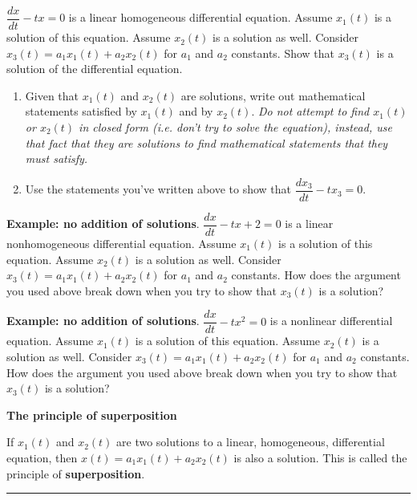 \documentclass[12pt,letterpaper,noanswers]{exam}
\begin{document}
$\dfrac{dx}{dt} - t x = 0$ is a linear homogeneous differential equation.  Assume $x_1(t)$ is a solution of this equation.  Assume $x_2(t)$ is a solution as well.  Consider $x_3(t) = a_1x_1(t) + a_2x_2(t)$ for $a_1$ and $a_2$ constants.  Show that $x_3(t)$ is a solution of the differential equation.
\begin{enumerate}
    \item Given that $x_1(t)$ and $x_2(t)$ are solutions, write out mathematical statements satisfied by $x_1(t)$ and by $x_2(t)$.  \emph{Do not attempt to find $x_1(t)$ or $x_2(t)$ in closed form (i.e. don't try to solve the equation), instead, use that fact that they are solutions to find mathematical statements that they must satisfy.}
    \vspace{1in}
    
    \item Use the statements you've written above to show that $\dfrac{d x_3}{dt} - t x_3 = 0$.
    \vspace{1in}
\end{enumerate}

\noindent\textbf{Example: no addition of solutions}.
$\dfrac{dx}{dt} - t x + 2 = 0$ is a linear nonhomogeneous differential equation.  Assume $x_1(t)$ is a solution of this equation.  Assume $x_2(t)$ is a solution as well.  Consider $x_3(t) = a_1x_1(t) + a_2x_2(t)$ for $a_1$ and $a_2$ constants.  How does the argument you used above break down when you try to show that $x_3(t)$ is a solution?
\vspace{2in}

\noindent\textbf{Example: no addition of solutions}.
$\dfrac{dx}{dt} - t x^2 = 0$ is a nonlinear differential equation.  Assume $x_1(t)$ is a solution of this equation.  Assume $x_2(t)$ is a solution as well.  Consider $x_3(t) = a_1x_1(t) + a_2x_2(t)$ for $a_1$ and $a_2$ constants.  How does the argument you used above break down when you try to show that $x_3(t)$ is a solution?
\vspace{2in}

\noindent\textbf{The principle of superposition}
\begin{tcolorbox}
If $x_1(t)$ and $x_2(t)$ are two solutions to a linear, homogeneous, differential equation, then $x(t) = a_1 x_1(t) + a_2x_2(t)$ is also a solution.  This is called the principle of \textbf{superposition}.
\end{tcolorbox}

\eject

\vspace{0.2cm}
\hrule
\vspace{0.2cm}
\end{document}
